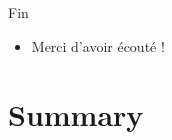 \documentclass{beamer}
\begin{document}
\begin{frame}{Fin}
\begin{itemize}
  \item {
  Merci d'avoir écouté !
  }
\end{itemize}
\end{frame}


\section*{Summary}
\end{document}
